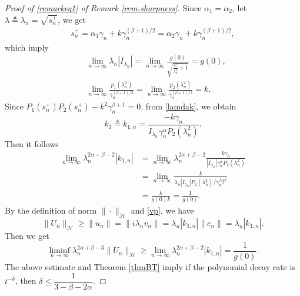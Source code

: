 \documentclass[12pt,reqno]{article}
\begin{document}
\begin{proof}[Proof of \eqref{remarkeq1} of Remark \ref{rem-sharpness}] Since $\alpha_1=\alpha_2 $, let $\lambda\triangleq\lambda_n=\sqrt{s_n^+}$, we get
\begin{align*}
 s_n^+=\alpha_1\gamma_n+k\gamma_n^{(\beta+1)/2}=\alpha_2\gamma_n+k\gamma_n^{(\beta+1)/2},
\end{align*}
  which imply
\begin{align*}
	&\lim_{n\to\infty}\lambda_n|I_{\lambda_n}|=\lim_{n\to\infty}\frac{g(0)}{\sqrt{\frac{\delta^2}{\lambda_n^2}+1}}=g(0),\\
	&\lim_{n\to\infty}\frac{p_1(\lambda_n^2)}{\gamma_n^{(\beta+1)/2}}=\lim_{n\to\infty}\frac{p_2(\lambda_n^2)}{\gamma_n^{(\beta+1)/2}}=k.
\end{align*}
Since $P_1(s_n^+)P_2(s_n^+) - k^2 \gamma_n^{\beta+1}=0$,  from \eqref{lamdak}, we obtain
\begin{equation}\label{k1n}
	k_1 \triangleq k_{1,n} = \frac{-k \gamma_n}{ I_{\lambda_n} \gamma_n^\alpha P_2(\lambda_n^2) }.
\end{equation}
Then it follows
\begin{align*}
	\lim_{n\to\infty} \lambda_n^{2\alpha+\beta-2} |k_{1,n}|
	&= \lim_{n\to\infty} \lambda_n^{2\alpha+\beta-2} \frac{k\gamma_n}{\left|I_{\lambda_n}\right| \gamma_n^\alpha P_2(\lambda_n^2)} \\
	&= \lim_{n\to\infty} \frac{k}{\lambda_n \left|I_{\lambda_n}\right| P_2(\lambda_n^2) /\gamma_n^{\frac{\beta+1}{2}}} \\
	&= \frac{k}{g(0)k}
	= \frac{1}{g(0)}.
\end{align*}
By the definition of norm $\|\cdot\|_{\mathcal{H}}$ and \eqref{vp}, we have
\[
\|U_n\|_{\mathcal{H}}\ge\|u_n\|=\|i\lambda_n v_n\|=\lambda_n|k_{1,n}|\|e_n\|=\lambda_n|k_{1,n}|.
\]
Then we get
\begin{equation*}
	\liminf_{n\to\infty}\lambda_n^{2\alpha+\beta-3}\|U_n\|_{\mathcal{H}}\ge \lim_{n\to\infty}\lambda_n^{2\alpha+\beta-2}|k_{1,n}|=\frac{1}{g(0)}.
\end{equation*}
The above estimate and Theorem \ref{thmBT} imply if the polynomial decay rate is $t^{-\delta}$,  then $\delta\le\dfrac{1}{3-\beta-2\alpha}.$
	\end{proof}
	
\end{document}
